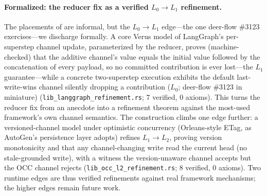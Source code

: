 \documentclass[journal,compsoc,10pt]{IEEEtran}
\theoremstyle{definition}
\theoremstyle{remark}
\begin{document}
\paragraph{Formalized: the reducer fix as a verified $L_0 \rightarrow L_1$ refinement.}
The placements of  are informal, but the
$L_0 \rightarrow L_1$ edge---the one deer-flow \#3123 exercises---we
discharge formally. A core Verus model of LangGraph's per-superstep channel
update, parameterized by the reducer, proves (machine-checked) that the
additive channel's value equals the initial value followed by the
concatenation of every payload, so no committed contribution is ever
lost---the $L_1$ guarantee---while a concrete two-superstep execution
exhibits the default last-write-wins channel silently dropping a
contribution ($L_0$; deer-flow \#3123 in miniature)
(\texttt{lib\_langgraph\_refinement.rs}; 7 verified, 0 axioms). This turns
the reducer fix from an anecdote into a refinement theorem against the
most-used framework's own channel semantics. The construction climbs one
edge further: a versioned-channel model under optimistic concurrency
(Orleans-style ETag, as AutoGen's persistence layer adopts) refines
$L_1 \rightarrow L_2$, proving version monotonicity and that any
channel-changing write read the current head (no stale-grounded write),
with a witness the version-unaware channel accepts but the OCC channel
rejects (\texttt{lib\_occ\_l2\_refinement.rs}; 8 verified, 0 axioms). Two
runtime edges are thus verified refinements against real framework
mechanisms; the higher edges remain future work.
\end{document}
